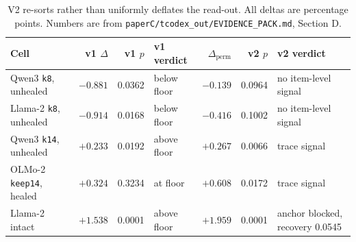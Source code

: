 \begin{table}[t]
\centering
\scriptsize
\setlength{\tabcolsep}{2.8pt}
\begin{tabular}{lrrlrrl}
\toprule
Cell & v1 $\Delta$ & v1 $p$ & v1 verdict & $\Delta_{\mathrm{perm}}$ & v2 $p$ & v2 verdict \\
\midrule
Qwen3 \texttt{k8}, unhealed & $-0.881$ & 0.0362 & below floor & $-0.139$ & 0.0964 & no item-level signal \\
Llama-2 \texttt{k8}, unhealed & $-0.914$ & 0.0168 & below floor & $-0.416$ & 0.1002 & no item-level signal \\
Qwen3 \texttt{k14}, unhealed & $+0.233$ & 0.0192 & above floor & $+0.267$ & 0.0066 & trace signal \\
OLMo-2 \texttt{keep14}, healed & $+0.324$ & 0.3234 & at floor & $+0.608$ & 0.0172 & trace signal \\
Llama-2 intact & $+1.538$ & 0.0001 & above floor & $+1.959$ & 0.0001 & anchor blocked, recovery 0.0545 \\
\bottomrule
\end{tabular}
\caption{V2 re-sorts rather than uniformly deflates the read-out. All deltas are percentage points. Numbers are from \texttt{paperC/tcodex\_out/EVIDENCE\_PACK.md}, Section D.}
\label{tab:v2-resort}
\end{table}
